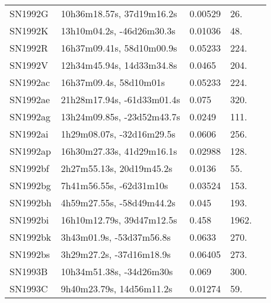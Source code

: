 \begin{longtable}{lllll}
          SN1992G &      10h36m18.57s, 37d19m16.2s &  0.00529 &            26. &    \citet{1991RC3.9.C...0000d} \\
          SN1992K &      13h10m04.2s, -46d26m30.3s &  0.01036 &            48. &    \citet{2004AJ....128...16K} \\
          SN1992R &      16h37m09.41s, 58d10m00.9s &  0.05233 &           224. &    \citet{1988AJ.....95.1602S} \\
          SN1992V &      12h34m45.94s, 14d33m34.8s &   0.0465 &           204. &    \citet{2006SDSS5.C...0000:} \\
         SN1992ac &         16h37m09.4s, 58d10m01s &  0.05233 &           224. &    \citet{1988AJ.....95.1602S} \\
         SN1992ae &     21h28m17.94s, -61d33m01.4s &    0.075 &           320. &    \citet{1999ApJ...517..565P} \\
         SN1992ag &     13h24m09.85s, -23d52m43.7s &   0.0249 &           111. &    \citet{20096dF...C...0000J} \\
         SN1992ai &      1h29m08.07s, -32d16m29.5s &   0.0606 &           256. &    \citet{20032dF...C...0000C} \\
         SN1992ap &      16h30m27.33s, 41d29m16.1s &  0.02988 &           128. &    \citet{1997AJ....113.1197H} \\
         SN1992bf &       2h27m55.13s, 20d19m45.2s &   0.0136 &            55. &    \citet{1999ApJS..121..287H} \\
         SN1992bg &        7h41m56.55s, -62d31m10s &  0.03524 &           153. &    \citet{20096dF...C...0000J} \\
         SN1992bh &      4h59m27.55s, -58d49m44.2s &    0.045 &           193. &    \citet{1999ApJ...517..565P} \\
         SN1992bi &      16h10m12.79s, 39d47m12.5s &    0.458 &          1962. &    \citet{1999ApJ...517..565P} \\
         SN1992bk &       3h43m01.9s, -53d37m56.8s &   0.0633 &           270. &    \citet{2016MNRAS.458..226D} \\
         SN1992bs &       3h29m27.2s, -37d16m18.9s &  0.06405 &           273. &    \citet{20096dF...C...0000J} \\
          SN1993B &       10h34m51.38s, -34d26m30s &    0.069 &           300. &    \citet{1993IAUC.56992...1P} \\
          SN1993C &       9h40m23.79s, 14d56m11.2s &  0.01274 &            59. &    \citet{1991RC3.9.C...0000d} \\

\end{longtable}
